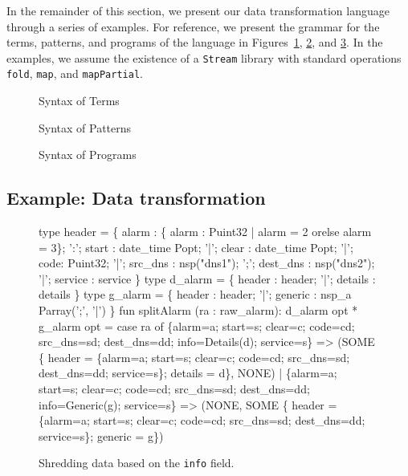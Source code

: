 In the remainder of this section, we present our data transformation language through a series of examples.  For reference, we present the grammar for the terms, patterns, and programs of the language in Figures~\ref{fig:syntax-terms}, \ref{fig:syntax-pat}, and \ref{fig:syntax-prog}.  In the examples, we assume the existence of a \texttt{Stream} library with standard operations \texttt{fold}, \texttt{map}, and \texttt{mapPartial}.


\begin{figure}
  \centering
  
  \caption{Syntax of Terms}
  \label{fig:syntax-terms}
\end{figure}

\begin{figure}
  \centering
  
  \caption{Syntax of Patterns}
  \label{fig:syntax-pat}
\end{figure}

\begin{figure}
  \centering
  
  \caption{Syntax of Programs}
  \label{fig:syntax-prog}
\end{figure}


\subsection{Example: Data transformation}
\begin{figure}
  \centering
  \begin{code}

type header = \{
       alarm : \{ alarm : Puint32 | alarm = 2 
                                    orelse alarm = 3\};
 ':';  start :  date_time Popt;
 '|';  clear :  date_time Popt;
 '|';  code: Puint32;
 '|';  src_dns  :  nsp("dns1");
 ';';  dest_dns :  nsp("dns2");
 '|';  service  : service
\}
  \mbox{}
type d_alarm = \{
       header   : header;
 '|';  details  : details
 \}
\mbox{}
type g_alarm = \{
       header   : header;
 '|';  generic  : nsp_a Parray(';', '|')
\}
\mbox{}
fun splitAlarm (ra : raw_alarm): d_alarm opt * g_alarm opt
  = case ra of
        \{alarm=a; start=s; clear=c; code=cd; src_dns=sd; 
         dest_dns=dd; info=Details(d); service=s\} 
        => 
        (SOME \{ header = \{alarm=a; start=s; clear=c; 
                          code=cd; src_dns=sd; 
                          dest_dns=dd; service=s\};
                details = d\}, 
         NONE)
      | \{alarm=a; start=s; clear=c; code=cd; src_dns=sd; 
         dest_dns=dd; info=Generic(g); service=s\} 
        => 
        (NONE,
         SOME \{ header = \{alarm=a; start=s; clear=c; 
                          code=cd; src_dns=sd; 
                          dest_dns=dd; service=s\};
                generic = g\})    
  \end{code}
  \caption{Shredding \darkstar{} data based on the {\tt info} field.}
  \label{fig:ex-no-err-check}
\end{figure}

